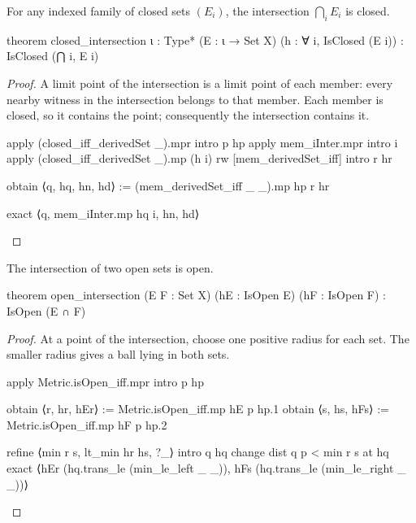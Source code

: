 \begin{corollary}
  \label{an1:cor:arbitrary-intersection-of-closed-sets-is-closed}
  For any indexed family of closed sets $(E_i)$, the intersection $\bigcap_i E_i$ is closed.

  \begin{lean}
    theorem closed_intersection {ι : Type*} (E : ι → Set X)
        (h : ∀ i, IsClosed (E i)) : IsClosed (⋂ i, E i)
  \end{lean}
\end{corollary}

\begin{proof}
  A limit point of the intersection is a limit point of each member: every nearby witness in the
  intersection belongs to that member.
  Each member is closed, so it contains the point; consequently the intersection contains it.

  \begin{lean}
    apply (closed_iff_derivedSet _).mpr
    intro p hp
    apply mem_iInter.mpr
    intro i
    apply (closed_iff_derivedSet _).mp (h i)
    rw [mem_derivedSet_iff]
    intro r hr

    obtain ⟨q, hq, hn, hd⟩ := (mem_derivedSet_iff _ _).mp hp r hr

    exact ⟨q, mem_iInter.mp hq i, hn, hd⟩
  \end{lean}

\end{proof}

\begin{lemma}
  \label{an1:lem:open-intersection}
  The intersection of two open sets is open.

  \begin{lean}
    theorem open_intersection (E F : Set X) (hE : IsOpen E) (hF : IsOpen F) :
        IsOpen (E ∩ F)
  \end{lean}
\end{lemma}

\begin{proof}
  At a point of the intersection, choose one positive radius for each set.
  The smaller radius gives a ball lying in both sets.

  \begin{lean}
    apply Metric.isOpen_iff.mpr
    intro p hp

    obtain ⟨r, hr, hEr⟩ := Metric.isOpen_iff.mp hE p hp.1
    obtain ⟨s, hs, hFs⟩ := Metric.isOpen_iff.mp hF p hp.2

    refine ⟨min r s, lt_min hr hs, ?_⟩
    intro q hq
    change dist q p < min r s at hq
    exact ⟨hEr (hq.trans_le (min_le_left _ _)), hFs (hq.trans_le (min_le_right _ _))⟩
  \end{lean}

\end{proof}

